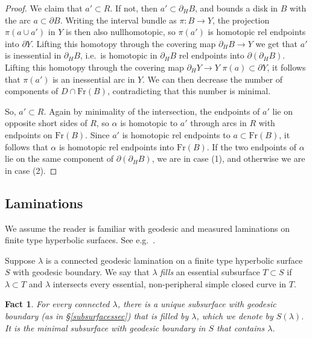 \documentclass[12pt]{amsart}
\newtheorem{fact}[theorem]{Fact}
\theoremstyle{definition}
\theoremstyle{remark}
\begin{document}
\begin{proof}
We claim that $a' \subset R$. If not, then $a'\subset \partial_H B$, and bounds a disk in $B$ with the arc $a \subset \partial B$. Writing the interval bundle as $\pi: B\longrightarrow Y$, the projection $\pi(a \cup a')$ in $Y$ is then also nullhomotopic, so $\pi(a')$ is homotopic rel endpoints into $\partial Y$.  Lifting this homotopy through the covering map $\partial_H B \longrightarrow Y$ we get that $a'$ is inessential in $\partial_H B$, i.e.\ is homotopic in $\partial_H B$ rel endpoints into $\partial(\partial_H B)$. Lifting this homotopy through the covering map $\partial_H Y \longrightarrow Y$ $\pi(a)\subset \partial Y$, it follows that $\pi(a')$ is an inessential arc in $Y$. We can then decrease the number of components of $D \cap \mathrm{Fr}(B)$, contradicting that this number is minimal. 

So, $a' \subset R$. Again by minimality of the intersection, the endpoints of $a'$ lie on opposite short sides of $R$, so $\alpha$ is homotopic to $a'$ through arcs in $R$ with endpoints on $\mathrm{Fr}(B)$. Since $a'$ is homotopic rel endpoints to $a \subset \mathrm{Fr}(B)$, it follows that $\alpha$ is homotopic rel endpoints into $\mathrm{Fr}(B)$. If the two endpoints of $\alpha $ lie on the same component of $\partial(\partial_H B)$, we are in case (1), and otherwise we are in case (2).
  \end{proof}


\subsection{Laminations} We assume the reader is familiar with geodesic and measured laminations on finite type hyperbolic surfaces. See e.g.\ \cite{Bleilerautomorphisms,Kapovichhyperbolic}.
\label{laminationssec}

Suppose $\lambda $ is a connected geodesic lamination on a finite type hyperbolic surface $S $ with geodesic boundary. We say that $\lambda$ \emph{fills} an essential subsurface $T \subset S$ if $\lambda \subset T$ and $\lambda$ intersects every essential, non-peripheral simple closed curve in $T$.

\begin{fact}
For every connected $\lambda$, there is a unique subsurface with geodesic boundary (as in \S\ref{subsurfacessec}) that is filled by $\lambda$, which we denote by $S(\lambda)$. It is the minimal subsurface with geodesic boundary in $S$ that contains $\lambda$.
\end{fact}
\end{document}
